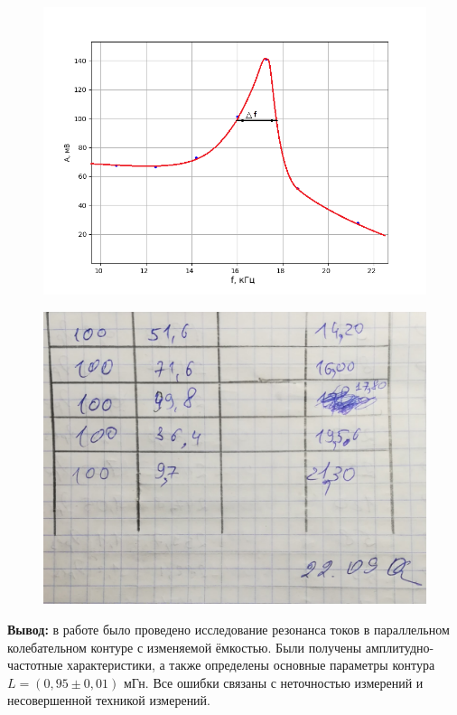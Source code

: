 \documentclass[a4paper,12pt]{article} %
\begin{document}
\begin{figure}[h!]
	\centering
	\includegraphics[scale=0.85]{Рез2Добр.png}
\end{figure}
\newpage
\begin{figure}[h!]
	\centering
	\includegraphics[scale=0.25]{Табл.jpg}
\end{figure}

\textbf{Вывод:} в работе было проведено исследование резонанса токов в параллельном колебательном контуре с изменяемой ёмкостью. Были получены амплитудно-частотные характеристики, а также определены основные параметры контура $L = (0,95 \pm 0,01)$ мГн. Все ошибки связаны с неточностью измерений и несовершенной техникой измерений.
\end{document}
